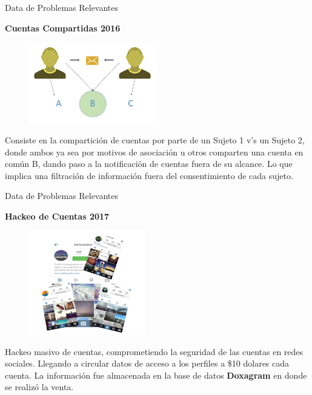 \begin{frame}[t,fragile]{Data de Problemas Relevantes}

\textbf{Cuentas Compartidas 2016}


\begin{figure} 
\vspace{2pt}
  \begin{center}
    \includegraphics[width=0.5\textwidth]{compartidaig.png}
    \label{fig:databaseUserTable}
  \end{center}
  \vspace{2pt}
\end{figure} 

\bigskip

Consiste en la compartición de cuentas por parte de un Sujeto 1 v's un Sujeto 2, donde ambos ya sea por motivos de asociación u otros comparten una cuenta en común B, dando paso a la notificación de cuentas fuera de su alcance. Lo que implica una filtración de información fuera del consentimiento de cada sujeto.

\end{frame}


\begin{frame}[t,fragile]{Data de Problemas Relevantes}

\textbf{Hackeo de Cuentas 2017}


\begin{figure} 
\vspace{2pt}
  \begin{center}
    \includegraphics[width=0.45\textwidth]{accounts.png}
    \label{fig:databaseUserTable}
  \end{center}
  \vspace{2pt}
\end{figure} 

\bigskip

Hackeo masivo de cuentas, comprometiendo la seguridad de las cuentas en redes sociales. Llegando a circular datos de acceso a los perfiles a \$10 dolares cada cuenta. La información fue almacenada en la base de datos \textbf{Doxagram} en donde se realizó la venta.



\end{frame}

